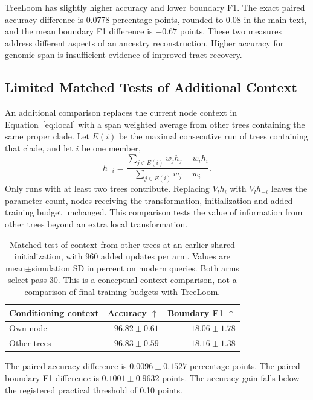 \documentclass[letterpaper]{article}
\newcommand{\best}[1]{\mathbf{#1}}
\begin{document}
TreeLoom has slightly higher accuracy and lower boundary F1. The exact paired accuracy difference is 0.0778 percentage points, rounded to 0.08 in the main text, and the mean boundary F1 difference is $-0.67$ points. These two measures address different aspects of an ancestry reconstruction. Higher accuracy for genomic span is insufficient evidence of improved tract recovery.

\subsection{Limited Matched Tests of Additional Context}
An additional comparison replaces the current node context in Equation~\ref{eq:local} with a span weighted average from other trees containing the same proper clade. Let $E(i)$ be the maximal consecutive run of trees containing that clade, and let $i$ be one member,
\begin{equation}
\bar h_{-i}=
\frac{\sum_{j\in E(i)}w_jh_j-w_ih_i}
{\sum_{j\in E(i)}w_j-w_i}.
\end{equation}
Only runs with at least two trees contribute. Replacing $V_lh_i$ with $V_l\bar h_{-i}$ leaves the parameter count, nodes receiving the transformation, initialization and added training budget unchanged. This comparison tests the value of information from other trees beyond an extra local transformation.

\begin{table}[t]
\centering
\small
\begin{tabular}{@{}lrr@{}}
\toprule
Conditioning context & Accuracy $\uparrow$ & Boundary F1 $\uparrow$\\
\midrule
Own node &$96.82\pm0.61$&$18.06\pm1.78$\\
Other trees &$\best{96.83\pm0.59}$&$\best{18.16\pm1.38}$\\
\bottomrule
\end{tabular}
\caption{Matched test of context from other trees at an earlier shared initialization, with 960 added updates per arm. Values are mean$\pm$simulation SD in percent on modern queries. Both arms select pass 30. This is a conceptual context comparison, not a comparison of final training budgets with TreeLoom.}
\label{tab:episode}
\end{table}

The paired accuracy difference is $0.0096\pm0.1527$ percentage points. The paired boundary F1 difference is $0.1001\pm0.9632$ points. The accuracy gain falls below the registered practical threshold of 0.10 points.
\end{document}
